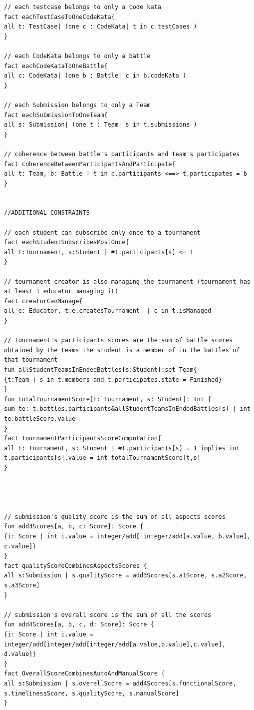 \begin{lstlisting}[language=alloy]
// each testcase belongs to only a code kata
fact eachTestCaseToOneCodeKata{
all t: TestCase| (one c : CodeKata| t in c.testCases )
}

// each CodeKata belongs to only a battle
fact eachCodeKataToOneBattle{
all c: CodeKata| (one b : Battle| c in b.codeKata )
}

// each Submission belongs to only a Team
fact eachSubmissionToOneTeam{
all s: Submission| (one t : Team| s in t.submissions )
}

// coherence between battle's participants and team's participates
fact coherenceBetweenParticipantsAndParticipate{
all t: Team, b: Battle | t in b.participants <==> t.participates = b
}


//ADDITIONAL CONSTRAINTS

// each student can subscribe only once to a tournament
fact eachStudentSubscribesMostOnce{
all t:Tournament, s:Student | #t.participants[s] <= 1
}

// tournament creator is also managing the tournament (tournament has at least 1 educator managing it)
fact creatorCanManage{ 
all e: Educator, t:e.createsTournament  | e in t.isManaged 
}

// tournament's participants scores are the sum of battle scores obtained by the teams the student is a member of in the battles of that tournament
fun allStudentTeamsInEndedBattles[s:Student]:set Team{
{t:Team | s in t.members and t.participates.state = Finished}
}
fun totalTournamentScore[t: Tournament, s: Student]: Int {
sum te: t.battles.participants&allStudentTeamsInEndedBattles[s] | int te.battleScore.value
}
fact TournamentParticipantsScoreComputation{ 
all t: Tournament, s: Student | #t.participants[s] = 1 implies int t.participants[s].value = int totalTournamentScore[t,s]
}




// submission's quality score is the sum of all aspects scores
fun add3Scores[a, b, c: Score]: Score {
{i: Score | int i.value = integer/add[ integer/add[a.value, b.value], c.value]}
}
fact qualityScoreCombinesAspectsScores {
all s:Submission | s.qualityScore = add3Scores[s.a1Score, s.a2Score, s.a3Score] 
}

// submission's overall score is the sum of all the scores
fun add4Scores[a, b, c, d: Score]: Score {
{i: Score | int i.value = integer/add[integer/add[integer/add[a.value,b.value],c.value], d.value]}
}
fact OverallScoreCombinesAutoAndManualScore {
all s:Submission | s.overallScore = add4Scores[s.functionalScore, s.timelinessScore, s.qualityScore, s.manualScore]
}


\end{lstlisting}
